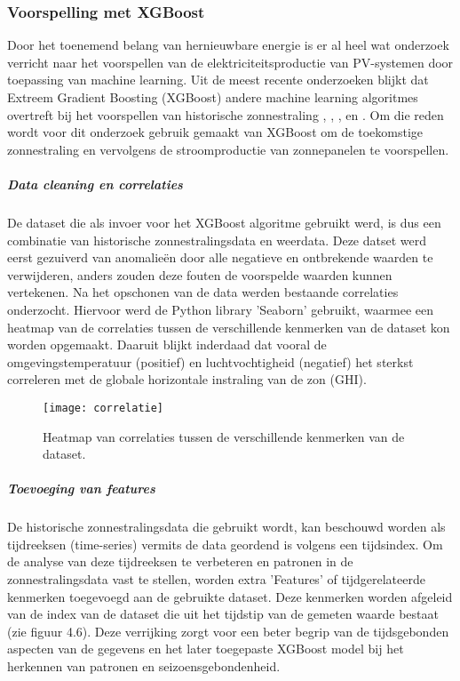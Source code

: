 \subsubsection{Voorspelling met XGBoost}

Door het toenemend belang van hernieuwbare energie is er al heel wat onderzoek verricht naar het voorspellen van de elektriciteitsproductie van PV-systemen door toepassing van machine learning. Uit de meest recente onderzoeken blijkt dat Extreem Gradient Boosting (XGBoost) andere machine learning algoritmes overtreft bij het voorspellen van historische zonnestraling \autocite{Khasawneh2024}, \autocite{Tercha2024},  \autocite{Ledmaoui2023}, \autocite{Wang2022} en \autocite{BarreraAnimas2022}. Om die reden wordt voor dit onderzoek gebruik gemaakt van XGBoost om de toekomstige zonnestraling en vervolgens de stroomproductie van zonnepanelen te voorspellen. 

\subparagraph{Data cleaning en correlaties}
De dataset die als invoer voor het XGBoost algoritme gebruikt werd, is dus een combinatie van historische zonnestralingsdata en weerdata. Deze datset werd eerst gezuiverd van anomalieën door alle negatieve en ontbrekende waarden te verwijderen, anders zouden deze fouten de voorspelde waarden kunnen vertekenen. Na het opschonen van de data werden bestaande correlaties onderzocht. Hiervoor werd de Python library 'Seaborn' gebruikt, waarmee een heatmap van de correlaties tussen de verschillende kenmerken van de dataset kon worden opgemaakt. Daaruit blijkt inderdaad dat vooral de omgevingstemperatuur (positief) en luchtvochtigheid (negatief) het sterkst correleren met de globale horizontale instraling van de zon (GHI). 

\begin{figure}[h!]
    \centering\texttt{[image: correlatie]}
    \caption{\label{fig:correlatie}Heatmap van correlaties tussen de verschillende kenmerken van de dataset.}
\end{figure} 

\newpage
\subparagraph{Toevoeging van features}
De historische zonnestralingsdata die gebruikt wordt, kan beschouwd worden als tijdreeksen (time-series) vermits de data geordend is volgens een tijdsindex. Om de analyse van deze tijdreeksen te verbeteren en patronen in de zonnestralingsdata vast te stellen, worden extra 'Features' of tijdgerelateerde kenmerken  toegevoegd aan de gebruikte dataset. Deze kenmerken worden afgeleid van de index van de dataset die uit het tijdstip van de gemeten waarde bestaat (zie figuur 4.6). Deze verrijking zorgt voor een beter begrip van de tijdsgebonden aspecten van de gegevens en het later toegepaste XGBoost model bij het herkennen van patronen en seizoensgebondenheid.  

